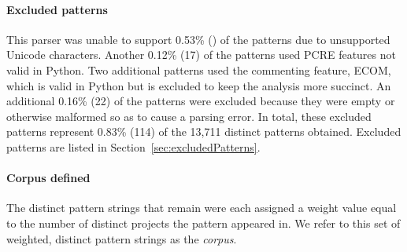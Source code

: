 \paragraph{Excluded patterns} This parser was unable to support 0.53\% () of the patterns due to unsupported Unicode characters.
Another 0.12\% (17) of the patterns used PCRE features not valid in Python.  Two additional patterns used the commenting feature, ECOM, which is valid in Python but is excluded to keep the analysis more succinct.  An additional 0.16\% (22) of the patterns were excluded because they were empty or otherwise malformed so as to cause a parsing error.  In total, these excluded patterns represent 0.83\% (114) of the 13,711 distinct patterns obtained.  Excluded patterns are listed in Section~\ref{sec:excludedPatterns}.

\paragraph{Corpus defined} The  distinct pattern strings that remain were each assigned a weight value equal to the number of distinct projects the pattern appeared in.  We  refer to this set of weighted, distinct pattern strings as the \emph{corpus}.
